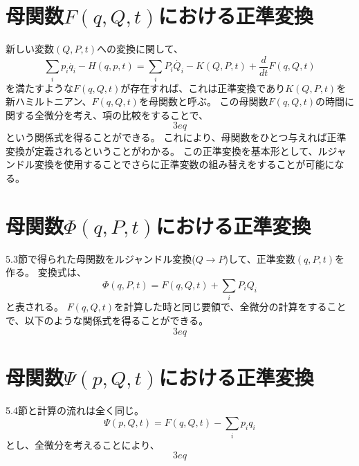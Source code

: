 \documentclass[a4paper]{jsreport}
\begin{document}
        \section{母関数$F(q, Q, t)$における正準変換}
            新しい変数$(Q, P, t)$への変換に関して、
            \begin{equation}
                \sum_{i} p_i \dot{q_i} - H(q, p, t) = \sum_{i} P_i \dot{Q_i} - K(Q, P, t) + \frac{d}{dt} F(q, Q, t)
            \end{equation}
            を満たすような$F(q, Q, t)$が存在すれば、これは正準変換であり$K(Q, P, t)$を新ハミルトニアン、$F(q, Q, t)$を母関数と呼ぶ。
            この母関数$F(q, Q, t)$の時間に関する全微分を考え、項の比較をすることで、
            \begin{equation}
                3eq
            \end{equation}
            という関係式を得ることができる。
            これにより、母関数をひとつ与えれば正準変換が定義されるということがわかる。
            この正準変換を基本形として、ルジャンドル変換を使用することでさらに正準変数の組み替えをすることが可能になる。

        \section{母関数$\Phi(q, P, t)$における正準変換}
            5.3節で得られた母関数をルジャンドル変換($Q \to P$)して、正準変数$(q, P, t)$を作る。
            変換式は、
            \begin{equation}
                \Phi(q, P, t) = F(q, Q, t) + \sum_{i} P_i Q_i
            \end{equation}
            と表される。
            $F(q, Q, t)$を計算した時と同じ要領で、全微分の計算をすることで、以下のような関係式を得ることができる。
            \begin{equation}
                3eq
            \end{equation}

        \section{母関数$\Psi(p, Q, t)$における正準変換}
            5.4節と計算の流れは全く同じ。
            \begin{equation}
                \Psi(p, Q, t) = F(q, Q, t) - \sum_{i} p_i q_i
            \end{equation}
            とし、全微分を考えることにより、
            \begin{equation}
                3eq
            \end{equation}
\end{document}
